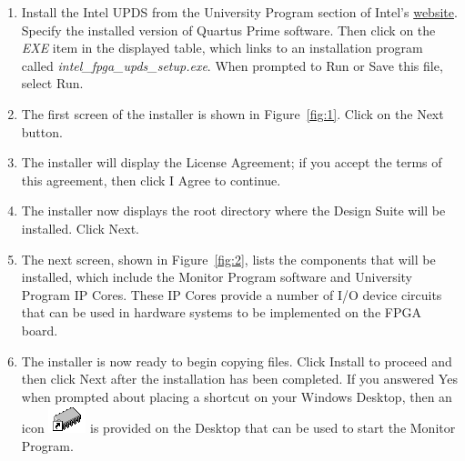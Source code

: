 \documentclass[11pt, twoside, pdftex]{article}
\begin{document}
\begin{enumerate}
\item Install the Intel UPDS from the University Program section of Intel's \href{https://www.intel.com/content/www/us/en/programmable/support/training/university/materials-software.html}{website}.
Specify the installed version of Quartus Prime software.
Then click on the {\it EXE} item in the displayed table, 
which links to an installation program called 
{\it intel\_fpga\_upds\_setup.exe}. When prompted to 
{\sf Run} or {\sf Save} this file, select {\sf Run}.
		  
\item The first screen of the installer is shown in Figure~\ref{fig:1}.
Click on the {\sf Next} button.

 \item The installer will display the License Agreement; if you accept the terms of this agreement, then click {\sf I Agree} to
continue.
	
\item The installer now displays the root directory where the
{\teamname} Design Suite will be installed.  
Click {\sf Next}.

\item The next screen, shown in Figure~\ref{fig:2}, lists the components that will be installed, which include the Monitor Program
software and University Program IP Cores. These IP Cores provide
a number of I/O device circuits that can be used in hardware
systems to be implemented on the FPGA board.

\item The installer is now ready to begin copying files. 
Click {\sf Install} to proceed and then click {\sf Next} after
the installation has been completed. 
If you answered {\sf Yes} when prompted about placing a shortcut on your Windows Desktop, then an icon 
\hbox{\includegraphics[scale=0.65]{images/img_shortcut_sm.png}}
is provided on the Desktop that can be used to start the Monitor
Program.


\end{enumerate}
\end{document}
